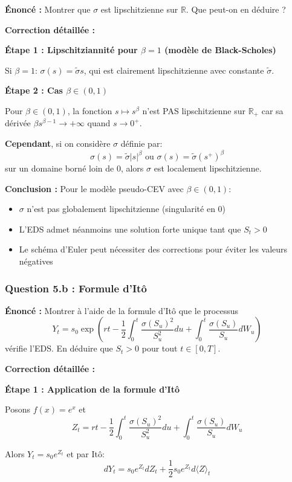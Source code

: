 \documentclass[12pt,a4paper]{article}
\theoremstyle{definition}
\newcommand{\R}{\mathbb{R}}
\begin{document}
\textbf{Énoncé :} Montrer que $\sigma$ est lipschitzienne sur $\R$. Que peut-on en déduire ?

\textbf{Correction détaillée :}

\textbf{Étape 1 : Lipschitziannité pour $\beta = 1$ (modèle de Black-Scholes)}

Si $\beta = 1$: $\sigma(s) = \tilde{\sigma} s$, qui est clairement lipschitzienne avec constante $\tilde{\sigma}$.

\textbf{Étape 2 : Cas $\beta \in (0,1)$}

Pour $\beta \in (0,1)$, la fonction $s \mapsto s^{\beta}$ n'est PAS lipschitzienne sur $\R_+$ car sa dérivée $\beta s^{\beta-1} \to +\infty$ quand $s \to 0^+$.

\textbf{Cependant}, si on considère $\sigma$ définie par:
\[
\sigma(s) = \tilde{\sigma} |s|^{\beta} \text{ ou } \sigma(s) = \tilde{\sigma} (s^+)^{\beta}
\]
sur un domaine borné loin de 0, alors $\sigma$ est localement lipschitzienne.

\textbf{Conclusion :} Pour le modèle pseudo-CEV avec $\beta \in (0,1)$:
\begin{itemize}
    \item $\sigma$ n'est pas globalement lipschitzienne (singularité en 0)
    \item L'EDS admet néanmoins une solution forte unique tant que $S_t > 0$
    \item Le schéma d'Euler peut nécessiter des corrections pour éviter les valeurs négatives
\end{itemize}

\subsubsection{Question 5.b : Formule d'Itô}

\textbf{Énoncé :} Montrer à l'aide de la formule d'Itô que le processus
\[
Y_t = s_0 \exp\left( rt - \frac{1}{2}\int_0^t \frac{\sigma(S_u)^2}{S_u^2} du + \int_0^t \frac{\sigma(S_u)}{S_u} dW_u \right)
\]
vérifie l'EDS. En déduire que $S_t > 0$ pour tout $t \in [0,T]$.

\textbf{Correction détaillée :}

\textbf{Étape 1 : Application de la formule d'Itô}

Posons $f(x) = e^x$ et 
\[
Z_t = rt - \frac{1}{2}\int_0^t \frac{\sigma(S_u)^2}{S_u^2} du + \int_0^t \frac{\sigma(S_u)}{S_u} dW_u
\]

Alors $Y_t = s_0 e^{Z_t}$ et par Itô:
\[
dY_t = s_0 e^{Z_t} dZ_t + \frac{1}{2} s_0 e^{Z_t} d\langle Z \rangle_t
\]
\end{document}
